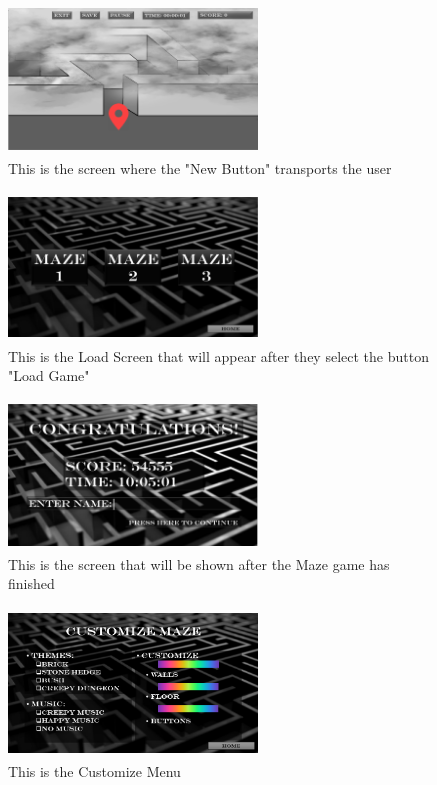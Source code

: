 \documentclass[10pt,conference,onecolumn,compsoc]{IEEEtran}
\begin{document}
\begin{figure}[ht!]
\includegraphics[height=150px, width=250px]{interface/Interface-BeginMaze.png}
\caption{This is the screen where the "New Button" transports the user}
\label{Start of Maze}
\end{figure}
\begin{figure}[ht!]
\includegraphics[height=150px, width=250px]{interface/Interface-Load.png}
\caption{This is the Load Screen that will appear after they select the button "Load Game"}
\label{Load Screen}
\end{figure}
\begin{figure}[ht!]
\includegraphics[height=150px, width=250px]{interface/Interface-Finish.png}
\caption{This is the screen that will be shown after the Maze game has finished}
\label{Finish Screen}
\end{figure}
\begin{figure}[ht!]
\includegraphics[height=150px, width=250px]{interface/Interface-Customize.png}
\caption{This is the Customize Menu}
\label{Customize Menu}
\end{figure}
\end{document}
